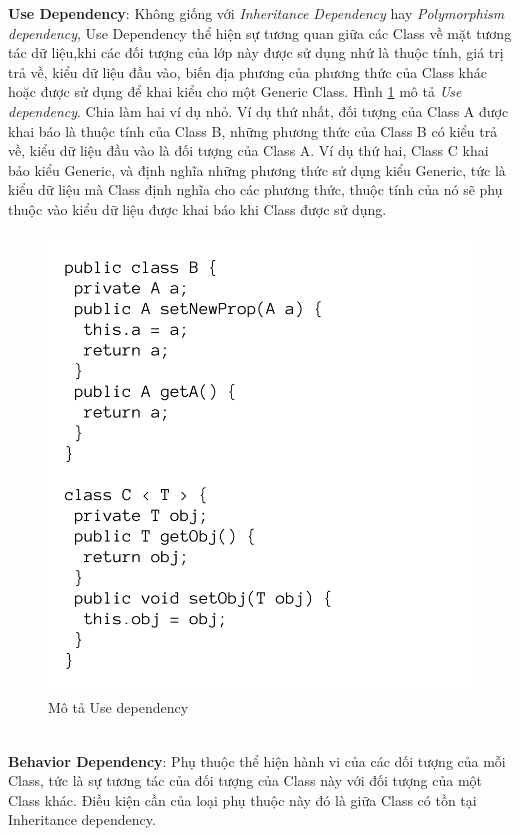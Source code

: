 \documentclass[12pt]{report}
\begin{document}
\textbf{Use Dependency}: Không giống với \textit{Inheritance Dependency} hay \textit{Polymorphism dependency}, Use Dependency thể hiện sự tương quan giữa các Class về mặt tương tác dữ liệu,khi các đối tượng của lớp này được sử dụng nhứ là thuộc tính, giá trị trả về, kiểu dữ liệu đầu vào, biến địa phương của phương thức của Class khác hoặc được sử dụng để khai kiểu cho một Generic Class.
\noindent Hình \ref{fig:use_dependency} mô tả \textit{Use dependency}. Chia làm hai ví dụ nhỏ. Ví dụ thứ nhất, đối tượng của Class A được khai báo là thuộc tính của Class B, những phương thức của Class B có kiểu trả về, kiểu dữ liệu đầu vào là đối tượng của Class A. Ví dụ thứ hai, Class C khai bảo kiểu Generic, và định nghĩa những phương thức sử dụng kiểu Generic, tức là kiểu dữ liệu mà Class định nghĩa cho các phương thức, thuộc tính của nó sẽ phụ thuộc vào kiểu dữ liệu được khai báo khi Class được sử dụng.
\begin{figure}[!htbp]
	\centering
	\vspace{-0.5cm}
	\includegraphics[scale=0.35]{images/use_dependency}
	\caption{Mô tả Use dependency}
	\label{fig:use_dependency}
\end{figure}
\\
\noindent \textbf{Behavior Dependency}: Phụ thuộc thể hiện hành vi của các dối tượng của mỗi Class, tức là sự tương tác của đối tượng của Class này với đối tượng của một Class khác. Điều kiện cần của loại phụ thuộc này đó là giữa Class có tồn tại Inheritance dependency.
\end{document}
